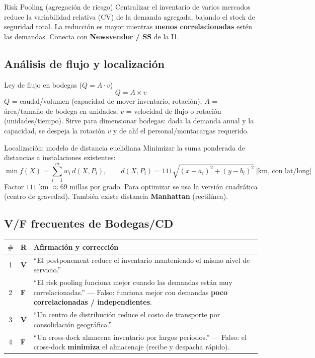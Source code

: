 \begin{definicion}{Risk Pooling (agregación de riesgo)}
Centralizar el inventario de varios mercados reduce la variabilidad relativa (CV) de la demanda agregada, bajando el stock de seguridad total. La reducción es mayor mientras \textbf{menos correlacionadas} estén las demandas. Conecta con \textbf{Newsvendor / SS} de la I1.
\end{definicion}

\subsection{Análisis de flujo y localización}

\begin{formulas}{Ley de flujo en bodegas ($Q = A\cdot v$)}
\[
  Q = A \times v
\]
$Q$ = caudal/volumen (capacidad de mover inventario, rotación), $A$ = área/tamaño de bodega en unidades, $v$ = velocidad de flujo o rotación (unidades/tiempo). Sirve para dimensionar bodegas: dada la demanda anual y la capacidad, se despeja la rotación $v$ y de ahí el personal/montacargas requerido.
\end{formulas}

\begin{formulas}{Localización: modelo de distancia euclidiana}
Minimizar la suma ponderada de distancias a instalaciones existentes:
\[
  \min f(X) = \sum_{i=1}^{m} w_i\, d(X, P_i), \qquad
  d(X,P_i) = 111\sqrt{(x-a_i)^2 + (y-b_i)^2}\ \text{[km, con lat/long]}
\]
Factor $111$ km $\approx 69$ millas por grado. Para optimizar se usa la versión cuadrática (centro de gravedad). También existe distancia \textbf{Manhattan} (rectilínea).
\end{formulas}

\subsection{V/F frecuentes de Bodegas/CD}

\begin{center}
\small
\begin{tabular}{@{}clp{10.5cm}@{}}
  \toprule
  $\#$ & R & Afirmación y corrección \\
  \midrule
  1 & \textbf{V} & ``El postponement reduce el inventario manteniendo el mismo nivel de servicio.'' \\
  2 & \textbf{F} & ``El risk pooling funciona mejor cuando las demandas están muy correlacionadas.'' --- Falso: funciona mejor con demandas \textbf{poco correlacionadas / independientes}. \\
  3 & \textbf{V} & ``Un centro de distribución reduce el costo de transporte por consolidación geográfica.'' \\
  4 & \textbf{F} & ``Un cross-dock almacena inventario por largos períodos.'' --- Falso: el cross-dock \textbf{minimiza} el almacenaje (recibe y despacha rápido). \\
  \bottomrule
\end{tabular}
\end{center}




